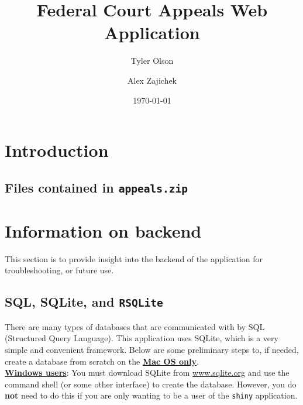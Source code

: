 \documentclass{article}
\begin{document}
\title{Federal Court Appeals Web Application }
\author{Tyler Olson \and Alex Zajichek}
\date{\today}
\maketitle

\section{Introduction}

\subsection{Files contained in {\tt appeals.zip}}


\section{Information on backend}
This section is to provide insight into the backend of the application for troubleshooting, or future use.

\subsection{SQL, SQLite, and {\tt RSQLite}}
There are many types of databases that are communicated with by SQL (Structured Query Language). This application uses SQLite, which is a very simple and convenient framework. Below are some preliminary steps to, if needed, create a database from scratch on the {\bf {\underline {Mac OS only}}}.\\


\noindent *\underline{{\bf Windows users}}: You must download SQLite from {\underline {www.sqlite.org}} and use the command shell (or some other interface) to create the database. However, you do {\bf not} need to do this if you are only wanting to be a user of the {\tt shiny} application. 
\end{document}

